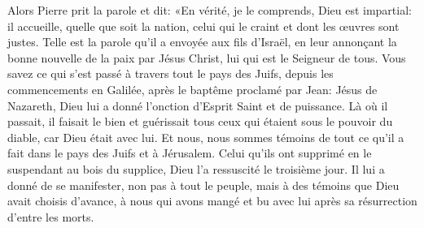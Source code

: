 Alors Pierre prit la parole et dit:
	«En vérité, je le comprends, Dieu est impartial:
	il accueille, quelle que soit la nation,
	celui qui le craint et dont les œuvres sont justes.
Telle est la parole qu’il a envoyée aux fils d’Israël,
	en leur annonçant la bonne nouvelle de la paix par Jésus Christ,
	lui qui est le Seigneur de tous.
Vous savez ce qui s’est passé à travers tout le pays des Juifs,
	depuis les commencements en Galilée, après le baptême proclamé par Jean:
	Jésus de Nazareth,
		Dieu lui a donné l’onction d’Esprit Saint et de puissance.
Là où il passait, il faisait le bien
	et guérissait tous ceux qui étaient sous le pouvoir du diable,
	car Dieu était avec lui.
Et nous, nous sommes témoins
	de tout ce qu’il a fait dans le pays des Juifs et à Jérusalem.
Celui qu’ils ont supprimé en le suspendant au bois du supplice,
	Dieu l’a ressuscité le troisième jour.
Il lui a donné de se manifester, non pas à tout le peuple,
	mais à des témoins que Dieu avait choisis d’avance,
	à nous qui avons mangé et bu avec lui
	après sa résurrection d’entre les morts.
